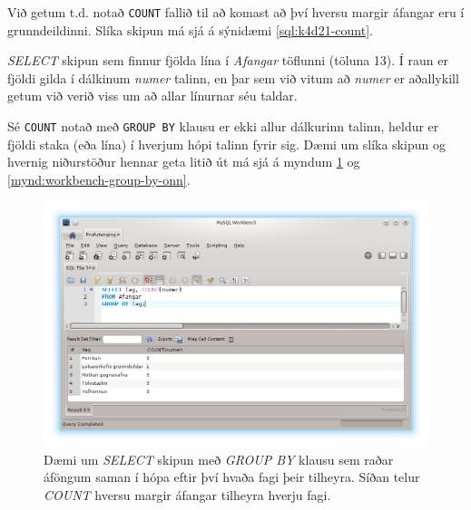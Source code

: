 Við getum t.d. notað \verb|COUNT| fallið til að komast að því hversu margir áfangar eru í grunndeildinni. Slíka skipun má sjá á sýnidæmi \ref{sql:k4d21-count}.

\begin{example}
\caption[COUNT á dálk]{\emph{SELECT} skipun sem finnur fjölda lína í \emph{Afangar} töflunni (töluna 13). Í raun er fjöldi gilda í dálkinum \emph{numer} talinn, en þar sem við vitum að \emph{numer} er aðallykill getum við verið viss um að allar línurnar séu taldar.}
\label{sql:k4d21-count}
\centering
{}
\end{example}

Sé \verb|COUNT| notað með \verb|GROUP BY| klausu er ekki allur dálkurinn talinn, heldur er fjöldi staka (eða lína) í hverjum hópi talinn fyrir sig. Dæmi um slíka skipun og hvernig niðurstöður hennar geta litið út má sjá á myndum \ref{mynd:workbench-group-by} og \ref{mynd:workbench-group-by-onn}.

\begin{figure}
\caption[GROUP BY og COUNT eftir fögum]{Dæmi um \emph{SELECT} skipun með \emph{GROUP BY} klausu sem raðar áföngum saman í hópa eftir því hvaða fagi þeir tilheyra. Síðan telur \emph{COUNT} hversu margir áfangar tilheyra hverju fagi.}
\label{mynd:workbench-group-by}
\centering
\includegraphics[width=\linewidth]{myndir/workbench-group-by}
\end{figure}

